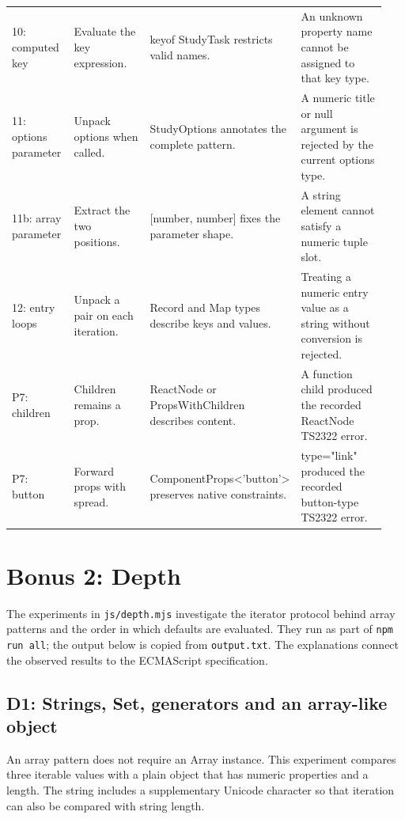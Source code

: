 \documentclass[10pt,a4paper]{article}
\begin{document}
\begin{longtable}{@{}L{0.170\linewidth}L{0.230\linewidth}L{0.270\linewidth}L{0.270\linewidth}@{}}
10: computed key & Evaluate the key expression. & keyof StudyTask restricts valid names. & An unknown property name cannot be assigned to that key type. \\[3pt]
11: options parameter & Unpack options when called. & StudyOptions annotates the complete pattern. & A numeric title or null argument is rejected by the current options type. \\[3pt]
11b: array parameter & Extract the two positions. & [number, number] fixes the parameter shape. & A string element cannot satisfy a numeric tuple slot. \\[3pt]
12: entry loops & Unpack a pair on each iteration. & Record and Map types describe keys and values. & Treating a numeric entry value as a string without conversion is rejected. \\[3pt]
P7: children & Children remains a prop. & ReactNode or PropsWithChildren describes content. & A function child produced the recorded ReactNode TS2322 error. \\[3pt]
P7: button & Forward props with spread. & ComponentProps<'button'> preserves native constraints. & type="link" produced the recorded button-type TS2322 error. \\[3pt]
\end{longtable}
\endgroup

\section{Bonus 2: Depth}

The experiments in \texttt{js/\allowbreak{}depth.\allowbreak{}mjs} investigate the iterator protocol behind array patterns and the order in which defaults are evaluated. They run as part of \texttt{npm run all}; the output below is copied from \texttt{output.\allowbreak{}txt}. The explanations connect the observed results to the ECMAScript specification.

\subsection{D1: Strings, Set, generators and an array-like object}

An array pattern does not require an Array instance. This experiment compares three iterable values with a plain object that has numeric properties and a length. The string includes a supplementary Unicode character so that iteration can also be compared with string length.
\end{document}
